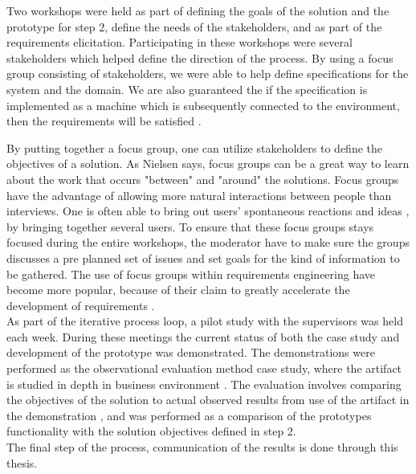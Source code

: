 Two workshops were held as part of defining the goals of the solution and the 
prototype for step 2, define the needs of the stakeholders, and as part of the 
requirements elicitation. Participating in these workshops were 
several stakeholders which helped define the direction of the process. By 
using a focus group consisting of stakeholders, we were able to help define 
specifications for the system and the domain. We are also guaranteed the if 
the specification is implemented as a machine which is subsequently connected 
to the environment, 
then the requirements will be satisfied \cite{zave1997four}. 


By putting together a focus group, one can utilize stakeholders to define the
objectives of a solution. As Nielsen \cite{FocusGroupstoStudyWorkPractice} 
says, focus groups can be a great way to learn about the work that occurs 
"between" and "around" the solutions. Focus groups have the advantage of allowing more natural interactions between people than interviews. One is often able to bring out users' spontaneous reactions and ideas \cite{nielsen1997use}, 
by bringing together several users. To ensure that these focus groups stays 
focused during the entire workshops, the moderator have to make sure the 
groups discusses a pre planned set of issues and set goals for the kind of 
information to be gathered. The use of focus groups within requirements 
engineering have become more popular, because of their claim to greatly 
accelerate the development of requirements \cite{goguen1993techniques}. \\

As part of the iterative process loop, a pilot study with the supervisors was 
held each week. During these meetings the current status of both the case 
study and development of the prototype was demonstrated. The demonstrations 
were performed as the observational evaluation method case study, where the 
artifact is studied in depth in business environment \cite{von2004design}. The 
evaluation involves comparing the objectives of the solution to actual 
observed results from use of the artifact in the demonstration 
\cite{peffers2006design}, and was performed as a comparison of the prototypes 
functionality with the solution objectives defined in step 2. \\

The final step of the process, communication of the results is done through this thesis.



